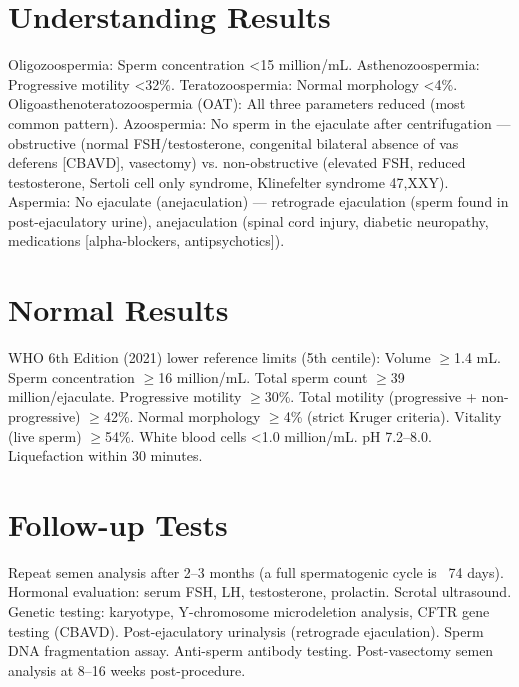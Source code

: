 \section*{Understanding Results}
Oligozoospermia: Sperm concentration <15 million/mL. Asthenozoospermia: Progressive motility <32\%. Teratozoospermia: Normal morphology <4\%. Oligoasthenoteratozoospermia (OAT): All three parameters reduced (most common pattern). Azoospermia: No sperm in the ejaculate after centrifugation --- obstructive (normal FSH/testosterone, congenital bilateral absence of vas deferens [CBAVD], vasectomy) vs. non-obstructive (elevated FSH, reduced testosterone, Sertoli cell only syndrome, Klinefelter syndrome 47,XXY). Aspermia: No ejaculate (anejaculation) --- retrograde ejaculation (sperm found in post-ejaculatory urine), anejaculation (spinal cord injury, diabetic neuropathy, medications [alpha-blockers, antipsychotics]).
\section*{Normal Results}
WHO 6th Edition (2021) lower reference limits (5th centile): Volume $\geq$1.4 mL. Sperm concentration $\geq$16 million/mL. Total sperm count $\geq$39 million/ejaculate. Progressive motility $\geq$30\%. Total motility (progressive + non-progressive) $\geq$42\%. Normal morphology $\geq$4\% (strict Kruger criteria). Vitality (live sperm) $\geq$54\%. White blood cells <1.0 million/mL. pH 7.2--8.0. Liquefaction within 30 minutes.
\section*{Follow-up Tests}
Repeat semen analysis after 2--3 months (a full spermatogenic cycle is ~74 days). Hormonal evaluation: serum FSH, LH, testosterone, prolactin. Scrotal ultrasound. Genetic testing: karyotype, Y-chromosome microdeletion analysis, CFTR gene testing (CBAVD). Post-ejaculatory urinalysis (retrograde ejaculation). Sperm DNA fragmentation assay. Anti-sperm antibody testing. Post-vasectomy semen analysis at 8--16 weeks post-procedure.
